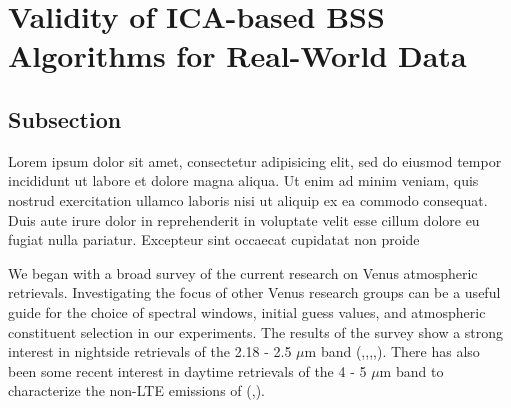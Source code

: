 \documentclass[5p]{elsarticle}
\begin{document}
\section{Validity of ICA-based BSS Algorithms for Real-World Data} 

\subsection{Subsection}

Lorem ipsum dolor sit amet, consectetur adipisicing elit, sed do eiusmod tempor incididunt ut labore et dolore magna aliqua. Ut enim ad minim veniam, quis nostrud exercitation ullamco laboris nisi ut aliquip ex ea commodo consequat. Duis aute irure dolor in reprehenderit in voluptate velit esse cillum dolore eu fugiat nulla pariatur. Excepteur sint occaecat cupidatat non proide

We began with a broad survey of the current research on Venus atmospheric retrievals. Investigating the focus of other Venus research groups can be a useful guide for the choice of spectral windows, initial guess values, and atmospheric constituent selection in our experiments. The results of the survey show a strong interest in nightside retrievals of the 2.18 - 2.5 $\mu$m band (\citep{tsang2008tropospheric},\citep{tsang2010correlations},\citep{marcq2005latitudinal},\citep{tsang2009variability},\citep{marcq2008latitudinal}). There has also been some recent interest in daytime retrievals of the 4 - 5 $\mu$m band to characterize the non-LTE emissions of  (\citep{peralta2010spatial},\citep{grassi2010thermal}).
\end{document}
